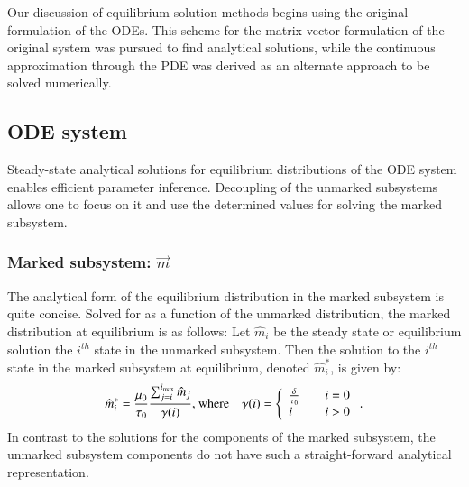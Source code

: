 \documentclass[review]{elsarticle}
\newcommand{\imax}{\ensuremath{i_{\max}}\xspace}
\newcommand{\mstarvec}{\ensuremath{\vec{m}}\xspace}
\begin{document}
Our discussion of equilibrium solution methods begins using the original formulation of the ODEs.
This scheme for the matrix-vector formulation of the original system was pursued to find analytical solutions, while the continuous approximation through the PDE was derived as an alternate approach to be solved numerically.  %

\subsection{ODE system}
Steady-state analytical solutions for equilibrium distributions of the ODE system enables efficient parameter inference.
Decoupling of the unmarked subsystems allows one to focus on it and use the determined values for solving the marked subsystem.  
\subsubsection{Marked subsystem: \mstarvec}
The analytical form of the equilibrium distribution in the marked subsystem is quite concise.
Solved for as a function of the unmarked distribution, the marked distribution at equilibrium is as follows:
Let $\hat{m}_{i}$ be the steady state or equilibrium solution the $i^{th}$ state in the unmarked subsystem.
Then the solution to the $i^{th}$ state in the marked subsystem at equilibrium, denoted $\hat{m}_{i}^{*}$, is given by:
\begin{equation}\label{eq:anyl_marked_eq}
\hat{m}_{i}^{*} = \frac{\mu_0}{\tau_0}\frac{\sum_{j=i}^{\imax}\hat{m}_{j}}{\gamma (i)} \text{, where\quad}
\gamma (i) = \left\{
        \begin{array}{ll}
            \frac{\delta}{\tau_0} & \quad i = 0 \\
            i & \quad i > 0
        \end{array}
    \right. .
\end{equation} 
In contrast to the solutions for the components of the marked subsystem, the unmarked subsystem components do not have such a straight-forward analytical representation.
\end{document}
